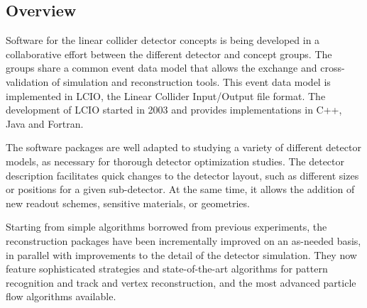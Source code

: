 \subsection{Overview}
Software for the linear collider detector concepts is being developed in a collaborative effort between the different detector and concept groups. The groups share a common event data model that allows the exchange and cross-validation of simulation and reconstruction tools. This event data model is implemented in LCIO, the Linear Collider Input/Output file format. The development of LCIO started in 2003 and provides implementations in C++, Java and Fortran.

The software packages are well adapted to studying a variety of different detector models, as necessary for thorough detector optimization studies. The detector description facilitates quick changes to the detector layout, such as different sizes or positions for a given sub-detector. At the same time, it allows the addition of new readout schemes, sensitive materials, or geometries.

Starting from simple algorithms borrowed from previous experiments, the reconstruction packages have been incrementally improved on an as-needed basis, in parallel with improvements to the detail of the detector simulation. They now feature sophisticated strategies and state-of-the-art algorithms for pattern recognition and track and vertex reconstruction, and the most advanced particle flow algorithms available.
